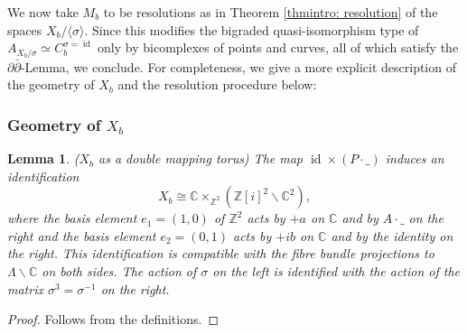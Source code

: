 \documentclass[12pt,reqno]{amsart}
\newtheorem{lem}[thm]{Lemma}
\theoremstyle{definition}
\newcommand{\Z}{\mathbb{Z}}
\newcommand{\C}{\mathbb{C}}
\DeclareMathOperator{\id}{id}
\begin{document}
We now take $M_b$ to be resolutions as in Theorem \ref{thmintro: resolution} of the spaces $X_b/\langle\sigma\rangle$. Since this modifies the bigraded quasi-isomorphism type of $A_{X_b/\sigma}\simeq C^{\sigma=\id}_b$ only by bicomplexes of points and curves, all of which satisfy the $\partial\bar\partial$-Lemma, we conclude. For completeness, we give a more explicit description of the geometry of $X_b$ and the resolution procedure below:

\subsubsection{Geometry of $X_b$}
\begin{lem}\label{lem: double mapping torus}($X_b$ as a double mapping torus)
The map $\id\times (P\cdot\_)$ induces an identification 
\[
X_b\cong \C\times_{\Z^2}(\Z[i]^2\backslash\C^2),
\]
where the basis element $e_1=(1,0)$ of $\Z^2$ acts by $+a$ on $\C$ and by $A\cdot\_$ on the right and the basis element $e_2=(0,1)$ acts by $+ib$ on $\C$ and by the identity on the right. This identification is compatible with the fibre bundle projections to $\Lambda\backslash\C$ on both sides. The action of $\sigma$ on the left is identified with the action of the matrix $\sigma^3=\sigma^{-1}$ on the right. 
\end{lem}
\begin{proof}
Follows from the definitions.
\end{proof}
\end{document}
